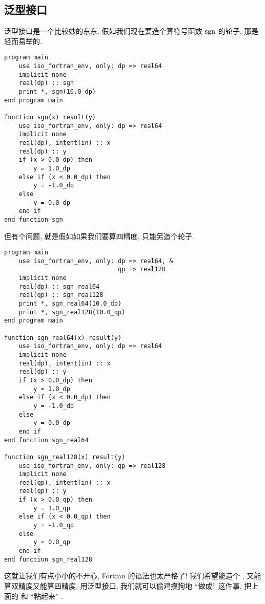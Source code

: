 \subsection{泛型接口} 

泛型接口是一个比较妙的东东. 假如我们现在要造个算符号函数 $ \operatorname{sgn} $ 的轮子, 那是轻而易举的. 
\begin{lstlisting} 
program main
    use iso_fortran_env, only: dp => real64
    implicit none
    real(dp) :: sgn
    print *, sgn(10.0_dp)
end program main

function sgn(x) result(y)
    use iso_fortran_env, only: dp => real64
    implicit none
    real(dp), intent(in) :: x
    real(dp) :: y
    if (x > 0.0_dp) then
        y = 1.0_dp
    else if (x < 0.0_dp) then
        y = -1.0_dp
    else
        y = 0.0_dp
    end if
end function sgn
\end{lstlisting} 
但有个问题, 就是假如如果我们要算四精度, 只能另造个轮子. 
\begin{lstlisting} 
program main
    use iso_fortran_env, only: dp => real64, &
                               qp => real128
    implicit none
    real(dp) :: sgn_real64
    real(qp) :: sgn_real128
    print *, sgn_real64(10.0_dp)
    print *, sgn_real128(10.0_qp)
end program main

function sgn_real64(x) result(y)
    use iso_fortran_env, only: dp => real64
    implicit none
    real(dp), intent(in) :: x
    real(dp) :: y
    if (x > 0.0_dp) then
        y = 1.0_dp
    else if (x < 0.0_dp) then
        y = -1.0_dp
    else
        y = 0.0_dp
    end if
end function sgn_real64

function sgn_real128(x) result(y)
    use iso_fortran_env, only: qp => real128
    implicit none
    real(qp), intent(in) :: x
    real(qp) :: y
    if (x > 0.0_qp) then
        y = 1.0_qp
    else if (x < 0.0_qp) then
        y = -1.0_qp
    else
        y = 0.0_qp
    end if
end function sgn_real128
\end{lstlisting} 
这就让我们有点小小的不开心, Fortran 的语法也太严格了! 我们希望能造个 , 又能算双精度又能算四精度. 用泛型接口, 我们就可以偷鸡摸狗地 ``做成'' 这件事, 把上面的  和   ``粘起来'' . 
